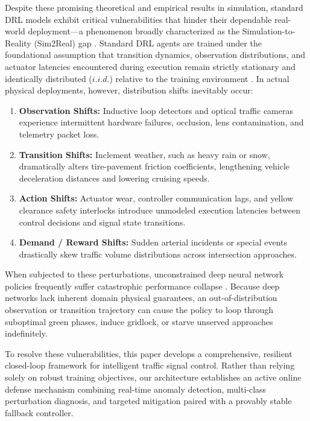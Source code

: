 \documentclass{ieeeaccess}
\begin{document}
Despite these promising theoretical and empirical results in simulation, standard DRL models exhibit critical vulnerabilities that hinder their dependable real-world deployment—a phenomenon broadly characterized as the Simulation-to-Reality (Sim2Real) gap \cite{dulac2021challenges, alrafi2026sim2signal}. Standard DRL agents are trained under the foundational assumption that transition dynamics, observation distributions, and actuator latencies encountered during execution remain strictly stationary and identically distributed ($i.i.d.$) relative to the training environment \cite{zhang2018study, gama2014survey}. In actual physical deployments, however, distribution shifts inevitably occur:
\begin{enumerate}
    \item \textbf{Observation Shifts:} Inductive loop detectors and optical traffic cameras experience intermittent hardware failures, occlusion, lens contamination, and telemetry packet loss.
    \item \textbf{Transition Shifts:} Inclement weather, such as heavy rain or snow, dramatically alters tire-pavement friction coefficients, lengthening vehicle deceleration distances and lowering cruising speeds.
    \item \textbf{Action Shifts:} Actuator wear, controller communication lags, and yellow clearance safety interlocks introduce unmodeled execution latencies between control decisions and signal state transitions.
    \item \textbf{Demand / Reward Shifts:} Sudden arterial incidents or special events drastically skew traffic volume distributions across intersection approaches.
\end{enumerate}

When subjected to these perturbations, unconstrained deep neural network policies frequently suffer catastrophic performance collapse \cite{dulac2021challenges, li2025robustlight}. Because deep networks lack inherent domain physical guarantees, an out-of-distribution observation or transition trajectory can cause the policy to loop through suboptimal green phases, induce gridlock, or starve unserved approaches indefinitely.

To resolve these vulnerabilities, this paper develops a comprehensive, resilient closed-loop framework for intelligent traffic signal control. Rather than relying solely on robust training objectives, our architecture establishes an active online defense mechanism combining real-time anomaly detection, multi-class perturbation diagnosis, and targeted mitigation paired with a provably stable fallback controller.
\end{document}
